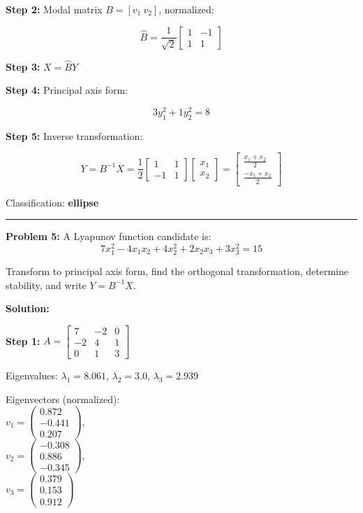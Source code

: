 \documentclass[
  letterpaper,
  DIV=11,
  numbers=noendperiod]{scrreprt}
\begin{document}
\textbf{Step 2:} Modal matrix \(B = [v_1\ v_2]\), normalized:

\[
\hat{B} = \frac{1}{\sqrt{2}}\begin{bmatrix}1 & -1\\1 & 1\end{bmatrix}
\]

\textbf{Step 3:} \(X = \hat{B}Y\)

\textbf{Step 4:} Principal axis form:

\[
3 y_1^2 + 1 y_2^2 = 8
\]

\textbf{Step 5:} Inverse transformation:

\[
Y = B^{-1}X = \frac{1}{2}\begin{bmatrix}1 & 1\\-1 & 1\end{bmatrix}\begin{bmatrix}x_1\\x_2\end{bmatrix} =
\begin{bmatrix}\frac{x_1 + x_2}{2}\\ \frac{-x_1 + x_2}{2}\end{bmatrix}
\]

Classification: \textbf{ellipse}

\begin{center}\rule{0.5\linewidth}{0.5pt}\end{center}

\textbf{Problem 5:} A Lyapunov function candidate is: \[
7x_1^{2}-4x_1x_2+4x_2^{2}+2x_2x_3+3x_3^{2}=15
\]

Transform to principal axis form, find the orthogonal transformation,
determine stability, and write \(Y=B^{-1}X\).

\textbf{Solution:}

\textbf{Step 1:}
\(A = \begin{bmatrix}7 & -2 & 0\\-2 & 4 & 1\\0 & 1 & 3\end{bmatrix}\)

Eigenvalues: \(\lambda_1 = 8.061\), \(\lambda_2 = 3.0\),
\(\lambda_3 = 2.939\)

Eigenvectors (normalized):\\
\(v_1 = \begin{pmatrix}0.872\\-0.441\\0.207\end{pmatrix}\),\\
\(v_2 = \begin{pmatrix}-0.308\\0.886\\-0.345\end{pmatrix}\),\\
\(v_3 = \begin{pmatrix}0.379\\0.153\\0.912\end{pmatrix}\)
\end{document}

